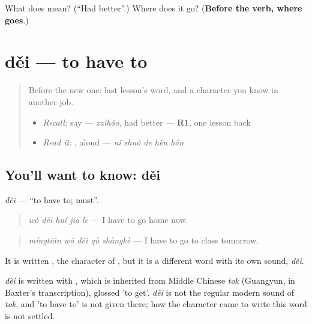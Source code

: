 \begin{tcolorbox}[breakable,colback=teal!4,colframe=teal!35!black,title={Before you move on}]
What does  mean? (\textquotedblleft{}Had better\textquotedblright{}.) Where does it go? (\textbf{Before the verb, where  goes}.)
\end{tcolorbox}
\section[děi]{děi — to have to}

\label{lesson:ZH-C282-dei}



\begin{quote}
Before the new one: last lesson's word, and a character you know in another job.

\begin{itemize}
\raggedright
  \item \emph{Recall:} say  — \emph{zuìhǎo}, had better — \textbf{R1}, one lesson back
  \item \emph{Read it:} , aloud — \emph{nǐ shuō de hěn hǎo}
\end{itemize}
\end{quote}

\subsection*{You'll want to know: děi}
\emph{děi} — \textquotedblleft{}to have to; must\textquotedblright{}.

\begin{quote}
\textbf{} \emph{wǒ děi huí jiā le} — I have to go home now.
\end{quote}

\begin{quote}
\textbf{} \emph{míngtiān wǒ děi qù shàngkè} — I have to go to class tomorrow.
\end{quote}

It is written , the character of , but it is a different word with its own sound, \emph{děi}.

\begin{cousinweb}
\emph{děi} is written with , which is inherited from Middle Chinese \emph{tok} (Guangyun, in Baxter's transcription), glossed 'to get'. \emph{děi} is not the regular modern sound of \emph{tok}, and 'to have to' is not given there; how the character came to write this word is not settled.
\end{cousinweb}

